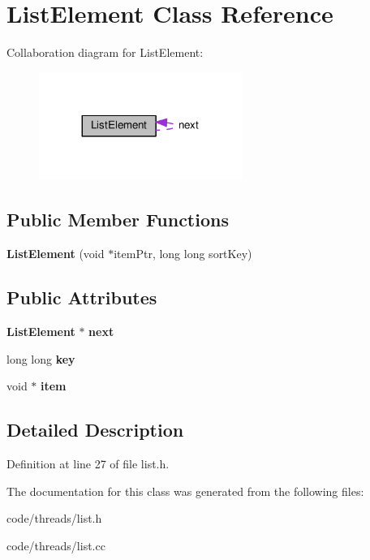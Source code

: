 \section{List\+Element Class Reference}
\label{class_list_element}


Collaboration diagram for List\+Element\+:\nopagebreak
\begin{figure}[H]
\begin{center}
\leavevmode
\includegraphics[width=188pt]{class_list_element__coll__graph}
\end{center}
\end{figure}
\subsection*{Public Member Functions}
\begin{DoxyCompactItemize}
\item 
{\bfseries List\+Element} (void $\ast$item\+Ptr, long long sort\+Key)\label{class_list_element_a1c8d6f93347462ddc05ad0465377ba1e}

\end{DoxyCompactItemize}
\subsection*{Public Attributes}
\begin{DoxyCompactItemize}
\item 
{\bf List\+Element} $\ast$ {\bfseries next}\label{class_list_element_aa8c417b2eb8a7b1e84dd9a2306624e61}

\item 
long long {\bfseries key}\label{class_list_element_a582785cee7d64d9397b7977e56c0185a}

\item 
void $\ast$ {\bfseries item}\label{class_list_element_ae138c41c51b6082a7b68db132f679e1e}

\end{DoxyCompactItemize}


\subsection{Detailed Description}


Definition at line 27 of file list.\+h.



The documentation for this class was generated from the following files\+:\begin{DoxyCompactItemize}
\item 
code/threads/list.\+h\item 
code/threads/list.\+cc\end{DoxyCompactItemize}
